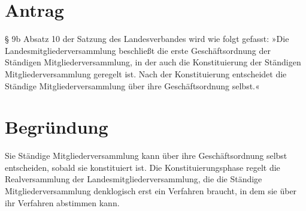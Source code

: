 \section{Antrag}

§ 9b Absatz 10 der Satzung des Landesverbandes wird wie folgt gefasst: »Die Landesmitgliederversammlung beschließt die erste Geschäftsordnung der Ständigen Mitgliederversammlung, in der auch die Konstituierung der Ständigen Mitgliederversammlung geregelt ist. Nach der Konstituierung entscheidet die Ständige Mitgliederversammlung über ihre Geschäftsordnung selbst.«

\section{Begründung}

Sie Ständige Mitgliederversammlung kann über ihre Geschäftsordnung selbst entscheiden, sobald sie konstituiert ist. Die Konstituierungsphase regelt die Realversammlung der Landesmitgliederversammlung, die die Ständige Mitgliederversammlung denklogisch erst ein Verfahren braucht, in dem sie über ihr Verfahren abstimmen kann.
